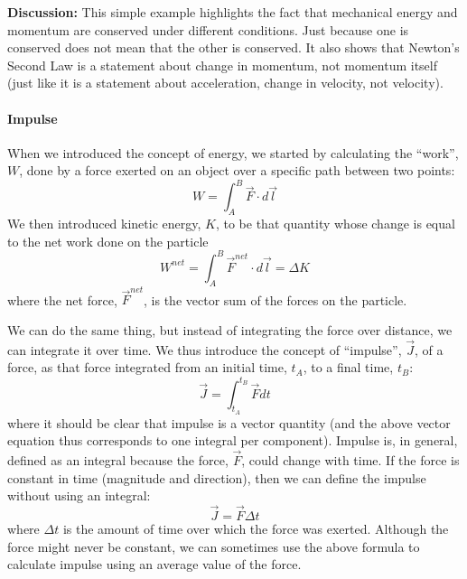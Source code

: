 \begin{framed}
\begin{framed}
\textbf{Discussion:} This simple example highlights the fact that mechanical energy and momentum are conserved under different conditions. Just because one is conserved does not mean that the other is conserved. It also shows that Newton's Second Law is a statement about change in momentum, not momentum itself (just like it is a statement about acceleration, change in velocity, not velocity).
\end{framed}
\end{framed}

\paragraph{Impulse}

When we introduced the concept of energy, we started by calculating the ``work'', $W$, done by a force exerted on an object over a specific path between two points:
\begin{equation}
W = \int_A^B \vec F \cdot d\vec l
\end{equation}
We then introduced kinetic energy, $K$, to be that quantity whose change is equal to the net work done on the particle
\begin{equation}
W^{net} = \int_A^B \vec F^{net}\cdot d\vec l = \Delta K
\end{equation}
where the net force, $\vec F^{net}$, is the vector sum of the forces on the particle.

We can do the same thing, but instead of integrating the force over distance, we can integrate it over time. We thus introduce the concept of ``impulse'', $\vec J$, of a force, as that force integrated from an initial time, $t_A$, to a final time, $t_B$:
\begin{equation}
\vec J = \int_{t_A}^{t_B}\vec F dt
\end{equation}
where it should be clear that impulse is a vector quantity (and the above vector equation thus corresponds to one integral per component). Impulse is, in general, defined as an integral because the force, $\vec F$, could change with time. If the force is constant in time (magnitude and direction), then we can define the impulse without using an integral:
\begin{equation}
\vec J = \vec F \Delta t
\end{equation}
where $\Delta t$ is the amount of time over which the force was exerted. Although the force might never be constant, we can sometimes use the above formula to calculate impulse using an average value of the force.

